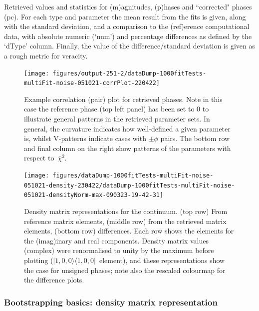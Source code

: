 \documentclass[10pt]{article}
\begin{document}
\begin{table}
\caption{{\label{tab:matE}Retrieved values and statistics for (m)agnitudes, (p)hases and ``corrected" phases (pc). For each type and parameter the mean result from the fits is given, along with the standard deviation, and a comparison to the (ref)erence computational data, with absolute numeric (`num') and percentage differences as defined by the `dType' column. Finally, the value of the difference/standard deviation is given as a rough metric for veracity.}}
\end{table}
\begin{figure}[H]
\begin{center}
\texttt{[image: figures/output-251-2/dataDump-1000fitTests-multiFit-noise-051021-corrPlot-220422]}
\caption{{Example correlation (pair) plot for retrieved phases. Note in this case
the reference phase (top left panel) has been set to 0 to illustrate
general patterns in the retrieved parameter sets. In general, the
curvature indicates how well-defined a given parameter is, whilst
V-patterns indicate cases with \(\pm\phi\) pairs. The bottom row
and final column on the right show patterns of the parameters with
respect to~\(\bar{\chi}^2\).
{\label{888108}}%
}}
\end{center}
\end{figure}
\begin{figure}[H]
\begin{center}
\texttt{[image: figures/dataDump-1000fitTests-multiFit-noise-051021-density-230422/dataDump-1000fitTests-multiFit-noise-051021-densityNorm-max-090323-19-42-31]}
\caption{{Density matrix representations for the continuum. (top row) From
reference matrix elements, (middle row) from the retrieved matrix
elements, (bottom row) differences. Each row shows the elements for the
(imag)inary and real components. Density matrix values (complex) were
renormalised to unity by the maximum before plotting
(\(|1,0,0\rangle \langle1,0,0|\)~element), and these representations show the case
for unsigned phases; note also the rescaled colourmap for the difference
plots.~
{\label{998904}}%
}}
\end{center}
\end{figure}

\subsubsection{Bootstrapping basics: density matrix representation\label{sec:den-mat-N2}}
\end{document}
